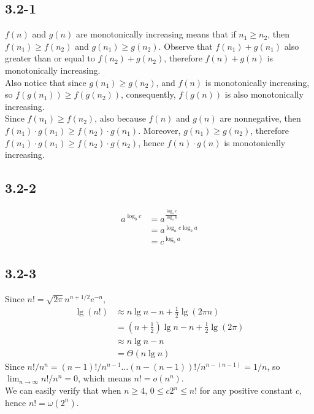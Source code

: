 \subsection{3.2-1}
    $f(n)$ and $g(n)$ are monotonically increasing means that if $n_1\ge n_2$,
    then $f(n_1)\ge f(n_2)$ and $g(n_1)\ge g(n_2)$. Observe that
    $f(n_1)+g(n_1)$ also greater than or equal to $f(n_2)+g(n_2)$, therefore
    $f(n)+g(n)$ is monotonically increasing. \\
    Also notice that since $g(n_1)\ge g(n_2)$, and $f(n)$ is monotonically
    increasing, so $f(g(n_1)) \ge f(g(n_2))$, consequently, $f(g(n))$ is also
    monotonically increasing. \\
    Since $f(n_1)\ge f(n_2)$, also because $f(n)$ and $g(n)$ are nonnegative,
    then $f(n_1)\cdot g(n_1)\ge f(n_2)\cdot g(n_1)$.  Moreover,
    $g(n_1)\ge g(n_2)$, therefore $f(n_1)\cdot g(n_1) \ge f(n_2)\cdot g(n_2)$,
    hence $f(n)\cdot g(n)$ is monotonically increasing.
\subsection{3.2-2}
    \begin{align*}
        a^{\log_b{c}} &= a^{\frac{\log_a{c}}{\log_a{b}}}\\
                      &= a^{\log_a{c}\log_b{a}}\\
                      &= c^{\log_b{a}}
    \end{align*}
\subsection{3.2-3}
    Since $n!=\sqrt{2\pi}n^{n+1/2}e^{-n}$,
    \begin{align*}
        \lg (n!)    &\approx    n\lg n - n + \frac{1}{2}
        \lg(2\pi n) \\
                &=(n+\frac{1}{2})\lg n -n + \frac
                {1}{2}\lg(2\pi) \\
                &\approx n\lg n -n  \\
                &=  \Theta(n\lg n)
    \end{align*}
    Since $n!/n^n=(n-1)!/n^{n-1}\ldots (n-(n-1))!/
    n^{n-(n-1)}=1/n$, so $\lim_{n\to \infty}n!/n^n=0$,
    which means $n!=o(n^n)$. \\
    We can easily verify that when $n\ge4$, $0\le c2^n \le n!$ for any
    positive constant $c$, hence $n!=\omega(2^n)$.

